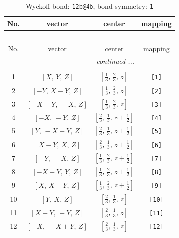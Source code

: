 \documentclass[fleqn,8pt]{jsarticle}
\begin{document}
\begin{longtable}{cccc}
\caption{Wyckoff bond: {\tt 12b@4b}, bond symmetry: {\tt 1}}
 \\
 \hline \hline
No. & vector & center & mapping \\ \hline \endfirsthead

\multicolumn{3}{l}{\tablename\ \thetable{}} \\
 \hline \hline
No. & vector & center & mapping \\ \hline \endhead

 \hline \hline
\multicolumn{3}{r}{\footnotesize\it continued ...} \\ \endfoot

 \hline \hline
\multicolumn{3}{r}{} \\ \endlastfoot

1 & $\left[ X,\, Y,\, Z \right]$ & $\left[ \frac{1}{3},\, \frac{2}{3},\, z \right]$ & {\tt [1]} \\ \hline
2 & $\left[ - Y,\, X - Y,\, Z \right]$ & $\left[ \frac{1}{3},\, \frac{2}{3},\, z \right]$ & {\tt [2]} \\ \hline
3 & $\left[ - X + Y,\, - X,\, Z \right]$ & $\left[ \frac{1}{3},\, \frac{2}{3},\, z \right]$ & {\tt [3]} \\ \hline
4 & $\left[ - X,\, - Y,\, Z \right]$ & $\left[ \frac{2}{3},\, \frac{1}{3},\, z + \frac{1}{2} \right]$ & {\tt [4]} \\ \hline
5 & $\left[ Y,\, - X + Y,\, Z \right]$ & $\left[ \frac{2}{3},\, \frac{1}{3},\, z + \frac{1}{2} \right]$ & {\tt [5]} \\ \hline
6 & $\left[ X - Y,\, X,\, Z \right]$ & $\left[ \frac{2}{3},\, \frac{1}{3},\, z + \frac{1}{2} \right]$ & {\tt [6]} \\ \hline
7 & $\left[ - Y,\, - X,\, Z \right]$ & $\left[ \frac{1}{3},\, \frac{2}{3},\, z + \frac{1}{2} \right]$ & {\tt [7]} \\ \hline
8 & $\left[ - X + Y,\, Y,\, Z \right]$ & $\left[ \frac{1}{3},\, \frac{2}{3},\, z + \frac{1}{2} \right]$ & {\tt [8]} \\ \hline
9 & $\left[ X,\, X - Y,\, Z \right]$ & $\left[ \frac{1}{3},\, \frac{2}{3},\, z + \frac{1}{2} \right]$ & {\tt [9]} \\ \hline
10 & $\left[ Y,\, X,\, Z \right]$ & $\left[ \frac{2}{3},\, \frac{1}{3},\, z \right]$ & {\tt [10]} \\ \hline
11 & $\left[ X - Y,\, - Y,\, Z \right]$ & $\left[ \frac{2}{3},\, \frac{1}{3},\, z \right]$ & {\tt [11]} \\ \hline
12 & $\left[ - X,\, - X + Y,\, Z \right]$ & $\left[ \frac{2}{3},\, \frac{1}{3},\, z \right]$ & {\tt [12]} \\
\end{longtable}
\end{document}
